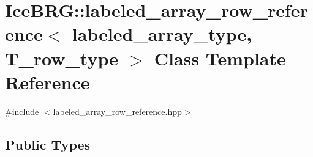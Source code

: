 \hypertarget{classIceBRG_1_1labeled__array__row__reference}{}\section{Ice\+B\+R\+G\+:\+:labeled\+\_\+array\+\_\+row\+\_\+reference$<$ labeled\+\_\+array\+\_\+type, T\+\_\+row\+\_\+type $>$ Class Template Reference}
\label{classIceBRG_1_1labeled__array__row__reference}


{\ttfamily \#include $<$labeled\+\_\+array\+\_\+row\+\_\+reference.\+hpp$>$}

\subsection*{Public Types}
